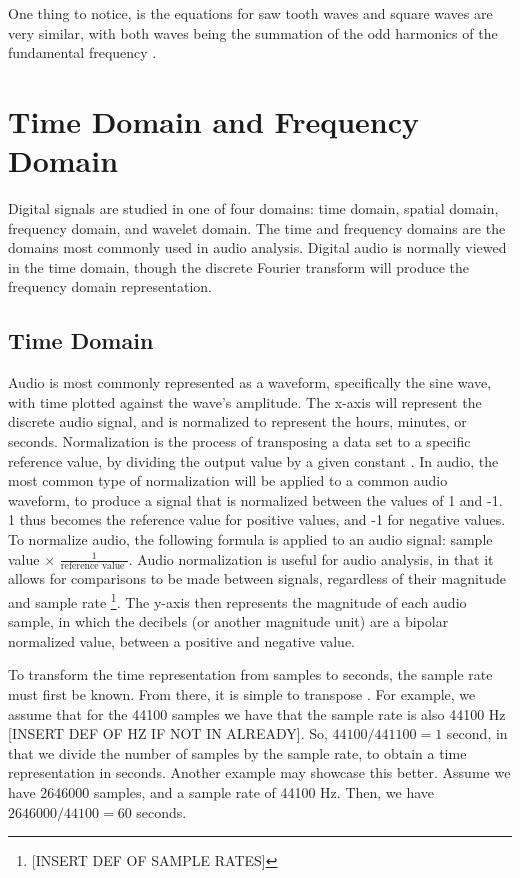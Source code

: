 One thing to notice, is the equations for saw tooth waves and square waves are very similar, with both waves being the summation of the odd harmonics of the fundamental frequency \cite{Tarr_2019}.

\section{Time Domain and Frequency Domain}

Digital signals are studied in one of four domains: time domain, spatial domain, frequency domain, and wavelet domain. The time and frequency domains are the domains most commonly used in audio analysis. Digital audio is normally viewed in the time domain, though the discrete Fourier transform will produce the frequency domain representation. 

\subsection{Time Domain}

Audio is most commonly represented as a waveform, specifically the sine wave, with time plotted against the wave's amplitude. The x-axis will represent the discrete audio signal, and is normalized to represent the hours, minutes, or seconds. Normalization is the process of transposing a data set to a specific reference value, by dividing the output value by a given constant \cite{Zjalic_2021}. In audio, the most common type of normalization will be applied to a common audio waveform, to produce a signal that is normalized between the values of 1 and -1. 1 thus becomes the reference value for positive values, and -1 for negative values. To normalize audio, the following formula is applied to an audio signal: sample value $\times$ $\frac{1}{\textrm{reference value }}$. Audio normalization is useful for audio analysis, in that it allows for comparisons to be made between signals, regardless of their magnitude and sample rate \footnote{[INSERT DEF OF SAMPLE RATES]}. The y-axis then represents the magnitude of each audio sample, in which the decibels (or another magnitude unit) are a bipolar normalized value, between a positive and negative value. 

To transform the time representation from samples to seconds, the sample rate must first be known. From there, it is simple to transpose \cite{Zjalic_2021}. For example, we assume that for the 44100 samples we have that the sample rate is also 44100 Hz [INSERT DEF OF HZ IF NOT IN ALREADY]. So, $44100 / 441100 = 1$ second, in that we divide the number of samples by the sample rate, to obtain a time representation in seconds. Another example may showcase this better. Assume we have 2646000 samples, and a sample rate of 44100 Hz. Then, we have $2646000/44100 = 60$ seconds.

